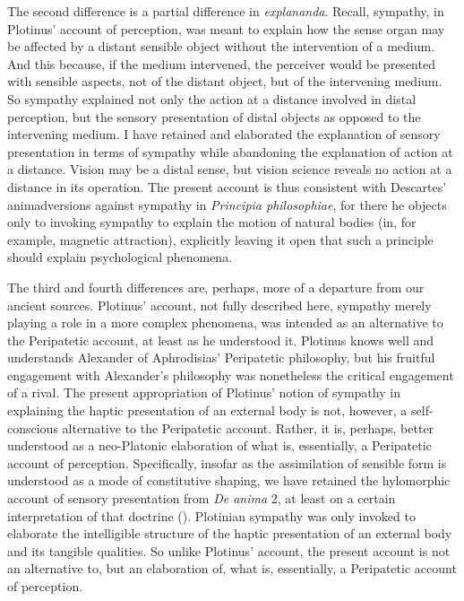 The second difference is a partial difference in \emph{explananda}. Recall, sympathy, in Plotinus' account of perception, was meant to explain how the sense organ may be affected by a distant sensible object without the intervention of a medium. And this because, if the medium intervened, the perceiver would be presented with sensible aspects, not of the distant object, but of the intervening medium. So sympathy explained not only the action at a distance involved in distal perception, but the sensory presentation of distal objects as opposed to the intervening medium. I have retained and elaborated the explanation of sensory presentation in terms of sympathy while abandoning the explanation of action at a distance. Vision may be a distal sense, but vision science reveals no action at a distance in its operation. The present account is thus consistent with Descartes' animadversions against sympathy in \emph{Principia philosophiae}, for there he objects only to invoking sympathy to explain the motion of natural bodies (in, for example, magnetic attraction), explicitly leaving it open that such a principle should explain psychological phenomena. 

The third and fourth differences are, perhaps, more of a departure from our ancient sources. Plotinus' account, not fully described here, sympathy merely playing a role in a more complex phenomena, was intended as an alternative to the Peripatetic account, at least as he understood it. Plotinus knows well and understands Alexander of Aphrodisias' Peripatetic philosophy, but his fruitful engagement with Alexander's philosophy was nonetheless the critical engagement of a rival. The present appropriation of Plotinus' notion of sympathy in explaining the haptic presentation of an external body is not, however, a self-conscious alternative to the Peripatetic account. Rather, it is, perhaps, better understood as a neo-Platonic elaboration of what is, essentially, a Peripatetic account of perception. Specifically, insofar as the assimilation of sensible form is understood as a mode of constitutive shaping, we have retained the hylomorphic account of sensory presentation from \emph{De anima} 2, at least on a certain interpretation of that doctrine (\citealt{Kalderon:2015fr}). Plotinian sympathy was only invoked to elaborate the intelligible structure of the haptic presentation of an external body and its tangible qualities. So unlike Plotinus' account, the present account is not an alternative to, but an elaboration of, what is, essentially, a Peripatetic account of perception.

